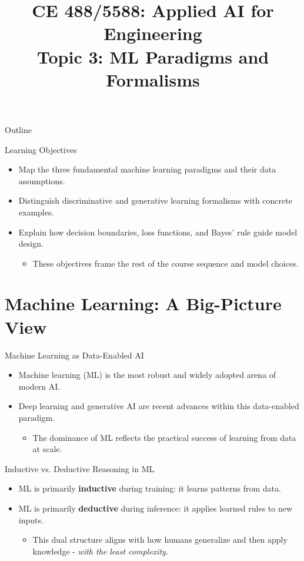 \documentclass[10pt]{beamer}
\title{CE 488/5588: Applied AI for Engineering\\ \large Topic 3: ML Paradigms and Formalisms}
\author{}
\institute{}
\date{}
\begin{document}
\begin{frame}
    \titlepage
\end{frame}

\begin{frame}{Outline}
    \justifying
    \tableofcontents
\end{frame}

\begin{frame}{Learning Objectives}
    \justifying
    \begin{itemize}
        \item Map the three fundamental machine learning paradigms and their data assumptions.
        \item Distinguish discriminative and generative learning formalisms with concrete examples.
        \item Explain how decision boundaries, loss functions, and Bayes' rule guide model design.
        \begin{itemize}
            \item These objectives frame the rest of the course sequence and model choices.
        \end{itemize}
    \end{itemize}
\end{frame}

\section{Machine Learning: A Big-Picture View}

\begin{frame}{Machine Learning as Data-Enabled AI}
    \justifying
    \begin{itemize}
        \item Machine learning (ML) is the most robust and widely adopted arena of modern AI.
        \item Deep learning and generative AI are recent advances within this data-enabled paradigm.
        \begin{itemize}
            \item The dominance of ML reflects the practical success of learning from data at scale.
        \end{itemize}
    \end{itemize}
\end{frame}

\begin{frame}{Inductive vs. Deductive Reasoning in ML}
    \justifying
    \begin{itemize}
        \item ML is primarily \textbf{inductive} during training: it learns patterns from data.
        \item ML is primarily \textbf{deductive} during inference: it applies learned rules to new inputs.
        \begin{itemize}
            \item This dual structure aligns with how humans generalize and then apply knowledge - \textit{with the least complexity}.
        \end{itemize}
    \end{itemize}
\end{frame}
\end{document}
